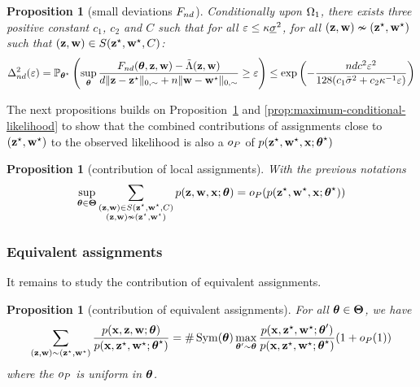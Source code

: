 \documentclass[bj]{imsart}
\numberwithin{equation}{section}
\theoremstyle{plain}
\newtheorem{proposition}[thm]{Proposition}
\theoremstyle{remark}
\begin{document}
\begin{proposition}[small deviations $F_{nd}$]
  \label{prop:profile-likelihood-convergence-local}
  Conditionally upon $\Omega_1$, there exists three positive constant $c_1$, $c_2$ and $C$ such that for all $\varepsilon \leq \kappa \underline{\sigma}^2$, for all $(\mathbf{z}, \mathbf{w}) \nsim(\mathbf{z}^\star, \mathbf{w}^\star)$ such that $(\mathbf{z}, \mathbf{w}) \in S(\mathbf{z}^\star, \mathbf{w}^\star, C)$:
  \begin{equation}
    \label{eq:profile-likelihood-convergence-local}
    \begin{aligned}
      \Delta_{\n\dd}^2(\vareps) = \Prob_{\bthetas}\left( \sup_{\btheta} \frac{\Fnd(\btheta, \bz, \bw) - \Lambtilde(\bz, \bw)}{\dd \| \bz - \bzs \|_{0, \sim} + \n \| \bw - \bws \|_{0, \sim}} \geq \vareps \right) \leq \exp \left( - \frac{\n\dd c^2 \vareps^2}{128(c_1 \vmax^2 + c_2 \neighborsize^{-1} \vareps)}\right)
    \end{aligned}
  \end{equation}
\end{proposition}

The next propositions builds on Proposition~\ref{prop:profile-likelihood-convergence-local} and \ref{prop:maximum-conditional-likelihood} to show that the combined contributions of assignments close to $(\mathbf{z}^\star, \mathbf{w}^\star)$ to the observed likelihood is also a $o_P$ of  $p(\mathbf{z}^\star, \mathbf{w}^\star, \mathbf{x}; \boldsymbol{\theta}^\star)$

\begin{proposition}[contribution of local assignments]
  \label{prop:small-deviations-profile-likelihood}
  With the previous notations
  \begin{equation*}
    \sup_{\btheta \in \bTheta} \sum_{\substack{(\bz, \bw) \in S(\bzs, \bws, C) \\ (\bz, \bw) \nsim (\bzs, \bws)}} \prob(\bz, \bw, \bx; \btheta) = \smallO_P( \prob(\bzs, \bws, \bx; \bthetas) )
  \end{equation*}
\end{proposition}


\subsubsection{Equivalent assignments}
It remains to study the contribution of equivalent assignments.
\begin{proposition}[contribution of equivalent assignments]
  \label{prop:equivalent-configurations-profile-likelihood}
  For all $\boldsymbol{\theta} \in \boldsymbol{\Theta}$, we have 
  \begin{equation*}
    \sum_{(\bz, \bw) \sim (\bzs, \bws)} \frac{\prob(\bx, \bz, \bw; \btheta)}{\prob(\bx, \bzs, \bws; \bthetas)} = \# \Symmetric(\btheta) \max_{\btheta' \sim \btheta} \frac{\prob(\bx, \bzs, \bws; \btheta')}{\prob(\bx, \bzs, \bws; \bthetas)} (1 + \smallO_P(1))
  \end{equation*}   
  where the $o_P$ is uniform in $\boldsymbol{\theta}$. 
\end{proposition}
\end{document}
